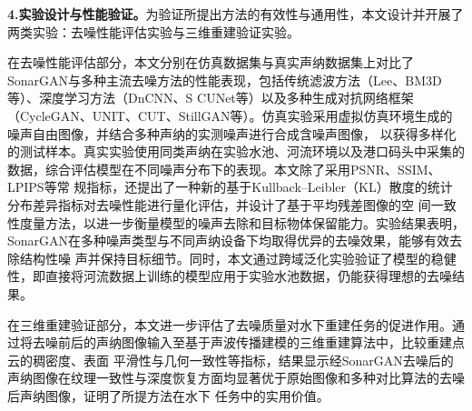 \textbf{4.实验设计与性能验证。}为验证所提出方法的有效性与通用性，本文设计并开展了两类实验：去噪性能评估实验与三维重建验证实验。

在去噪性能评估部分，本文分别在仿真数据集与真实声纳数据集上对比了SonarGAN与多种主流去噪方法的性能表现，包括传统滤波方法（Lee、BM3D等）、深度学习方法（DnCNN、S
CUNet等）以及多种生成对抗网络框架（CycleGAN、UNIT、CUT、StillGAN等）。仿真实验采用虚拟仿真环境生成的噪声自由图像，并结合多种声纳的实测噪声进行合成含噪声图像，
以获得多样化的测试样本。真实实验使用同类声纳在实验水池、河流环境以及港口码头中采集的数据，综合评估模型在不同噪声分布下的表现。本文除了采用PSNR、SSIM、LPIPS等常
规指标，还提出了一种新的基于Kullback–Leibler（KL）散度\cite{kullback1951information}的统计分布差异指标对去噪性能进行量化评估，并设计了基于平均残差图像的空
间一致性度量方法，以进一步衡量模型的噪声去除和目标物体保留能力。实验结果表明，SonarGAN在多种噪声类型与不同声纳设备下均取得优异的去噪效果，能够有效去除结构性噪
声并保持目标细节。同时，本文通过跨域泛化实验验证了模型的稳健性，即直接将河流数据上训练的模型应用于实验水池数据，仍能获得理想的去噪结果。

在三维重建验证部分，本文进一步评估了去噪质量对水下重建任务的促进作用。通过将去噪前后的声纳图像输入至基于声波传播建模的三维重建算法中，比较重建点云的稠密度、表面
平滑性与几何一致性等指标，结果显示经SonarGAN去噪后的声纳图像在纹理一致性与深度恢复方面均显著优于原始图像和多种对比算法的去噪后声纳图像，证明了所提方法在水下
任务中的实用价值。


